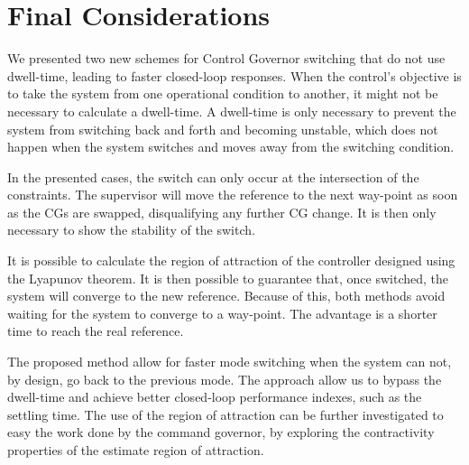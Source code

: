 
\chapter{Final Considerations}%
\label{chp:final-considerations}

We presented two new schemes for Control Governor switching that do not use
dwell-time, leading to faster closed-loop responses. When the control's
objective is to take the system from one operational condition to another, it
might not be necessary to calculate a dwell-time. A dwell-time is only necessary
to prevent the system from switching back and forth and becoming unstable, which
does not happen when the system switches and moves away from the switching
condition.

In the presented cases, the switch can only occur at the intersection of the
constraints. The supervisor will move the reference to the next way-point as
soon as the CGs are swapped, disqualifying any further CG change. It is then
only necessary to show the stability of the switch.

It is possible to calculate the region of attraction of the controller designed
using the Lyapunov theorem. It is then possible to guarantee that, once
switched, the system will converge to the new reference. Because of this, both
methods avoid waiting for the system to converge to a way-point. The advantage
is a shorter time to reach the real reference.

The proposed method allow for faster mode switching when the system can not, by
design, go back to the previous mode. The approach allow us to bypass the
dwell-time and achieve better closed-loop performance indexes, such as the
settling time. The use of the region of attraction can be further investigated
to easy the work done by the command governor, by exploring the contractivity
properties of the estimate region of attraction.
